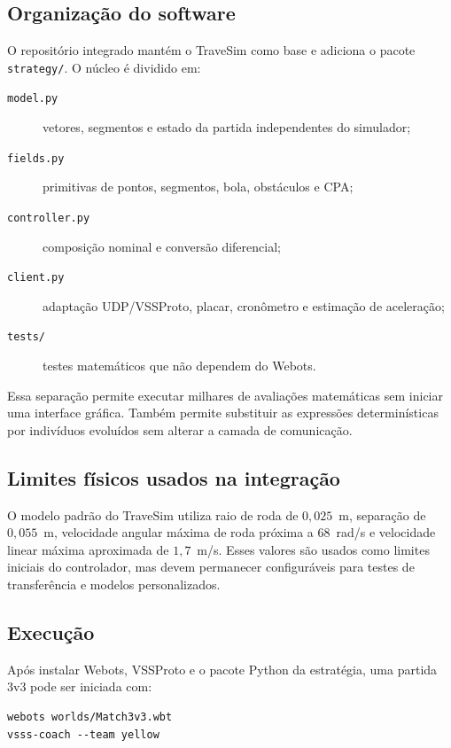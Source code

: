\documentclass[12pt,a4paper]{article}
\begin{document}
\subsection{Organiza\c{c}\~ao do software}

O reposit\'orio integrado mant\'em o TraveSim como base e adiciona o pacote \texttt{strategy/}. O n\'ucleo \'e dividido em:

\begin{description}
  \item[\texttt{model.py}] vetores, segmentos e estado da partida independentes do simulador;
  \item[\texttt{fields.py}] primitivas de pontos, segmentos, bola, obst\'aculos e CPA;
  \item[\texttt{controller.py}] composi\c{c}\~ao nominal e convers\~ao diferencial;
  \item[\texttt{client.py}] adapta\c{c}\~ao UDP/VSSProto, placar, cron\^ometro e estima\c{c}\~ao de acelera\c{c}\~ao;
  \item[\texttt{tests/}] testes matem\'aticos que n\~ao dependem do Webots.
\end{description}

Essa separa\c{c}\~ao permite executar milhares de avalia\c{c}\~oes matem\'aticas sem iniciar uma interface gr\'afica. Tamb\'em permite substituir as express\~oes determin\'isticas por indiv\'iduos evolu\'idos sem alterar a camada de comunica\c{c}\~ao.

\subsection{Limites f\'isicos usados na integra\c{c}\~ao}

O modelo padr\~ao do TraveSim utiliza raio de roda de $0{,}025$~m, separa\c{c}\~ao de $0{,}055$~m, velocidade angular m\'axima de roda pr\'oxima a $68$~rad/s e velocidade linear m\'axima aproximada de $1{,}7$~m/s. Esses valores s\~ao usados como limites iniciais do controlador, mas devem permanecer configur\'aveis para testes de transfer\^encia e modelos personalizados.

\subsection{Execu\c{c}\~ao}

Ap\'os instalar Webots, VSSProto e o pacote Python da estrat\'egia, uma partida 3v3 pode ser iniciada com:

\begin{verbatim}
webots worlds/Match3v3.wbt
vsss-coach --team yellow
\end{verbatim}
\end{document}
